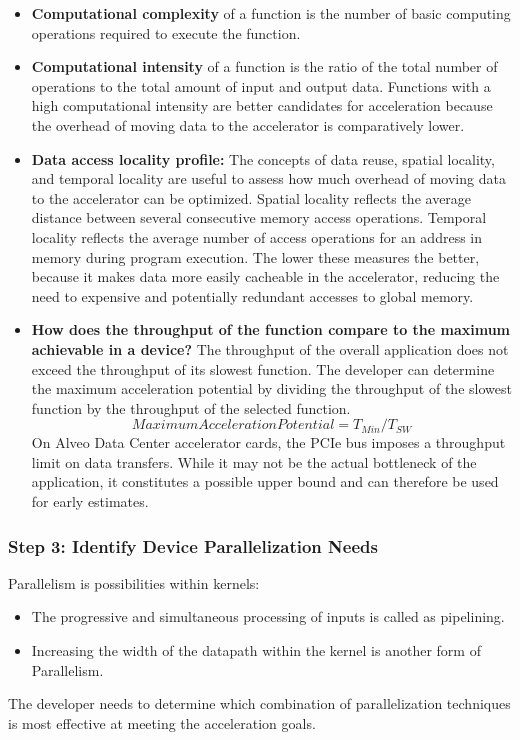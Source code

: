\begin{itemize}
    \item \textbf{Computational complexity} of a function is the number of basic computing operations required to execute the function.
    \item \textbf{Computational intensity} of a function is the ratio of the total number of operations to the total amount of input and output data. Functions with a high computational intensity are better candidates for acceleration because the overhead of moving data to the accelerator is comparatively lower.
    \item \textbf{Data access locality profile:} The concepts of data reuse, spatial locality, and temporal locality are useful to assess how much overhead of moving data to the accelerator can be optimized. Spatial locality reflects the average distance between several consecutive memory access operations. Temporal locality reflects the average number of access operations for an address in memory during program execution. The lower these measures the better, because it makes data more easily cacheable in the accelerator, reducing the need to expensive and potentially redundant accesses to global memory.
    \item \textbf{How does the throughput of the function compare to the maximum achievable in a device?} The throughput of the overall application does not exceed the throughput of its slowest function. The developer can determine the maximum acceleration potential by dividing the throughput of the slowest function by the throughput of the selected function.
    \[ Maximum Acceleration Potential = T_{Min} / T_{SW} \]
    On Alveo Data Center accelerator cards, the PCIe bus imposes a throughput limit on data transfers. While it may not be the actual bottleneck of the application, it constitutes a possible upper bound and can therefore be used for early estimates.
\end{itemize}

\subsubsection{Step 3: Identify Device Parallelization Needs}
Parallelism is possibilities within kernels:
\begin{itemize}
    \item The progressive and simultaneous processing of inputs is called as pipelining.
    \item Increasing the width of the datapath within the kernel is another form of Parallelism.
\end{itemize}
The developer needs to determine which combination of parallelization techniques is most effective at meeting the acceleration goals.

